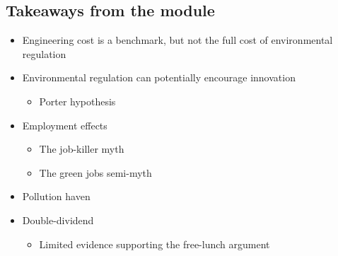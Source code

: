 \documentclass[
]{article}
\providecommand{\tightlist}{%
  \setlength{\itemsep}{0pt}\setlength{\parskip}{0pt}}
\begin{document}
\hypertarget{takeaways-from-the-module}{%
\subsection{Takeaways from the module}\label{takeaways-from-the-module}}

\begin{itemize}
\tightlist
\item
  Engineering cost is a benchmark, but not the full cost of
  environmental regulation
\item
  Environmental regulation can potentially encourage innovation

  \begin{itemize}
  \tightlist
  \item
    Porter hypothesis
  \end{itemize}
\item
  Employment effects

  \begin{itemize}
  \tightlist
  \item
    The job-killer myth
  \item
    The green jobs semi-myth
  \end{itemize}
\item
  Pollution haven
\item
  Double-dividend

  \begin{itemize}
  \tightlist
  \item
    Limited evidence supporting the free-lunch argument
  \end{itemize}
\end{itemize}
\end{document}
